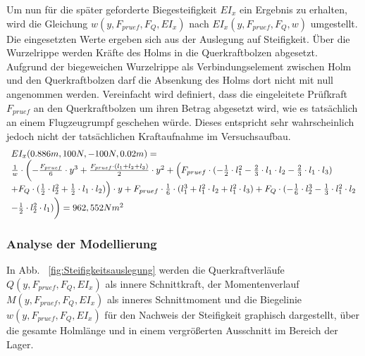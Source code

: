 \noindent Um nun für die später geforderte Biegesteifigkeit $EI_{x}$ ein Ergebnis zu erhalten, wird die Gleichung $w(y,F_{pruef},F_{Q}, EI_{x})$ nach $EI_{x}(y,F_{pruef},F_{Q},w)$ umgestellt. Die eingesetzten Werte ergeben sich aus der Auslegung auf Steifigkeit. Über die Wurzelrippe werden Kräfte des Holms in die Querkraftbolzen abgesetzt. Aufgrund der biegeweichen Wurzelrippe als Verbindungselement zwischen Holm und den Querkraftbolzen darf die Absenkung des Holms dort nicht mit null angenommen werden. Vereinfacht wird definiert, dass die eingeleitete Prüfkraft $F_{pruef}$ an den Querkraftbolzen um ihren Betrag abgesetzt wird, wie es tatsächlich an einem Flugzeugrumpf geschehen würde. Dieses entspricht sehr wahrscheinlich jedoch nicht der tatsächlichen Kraftaufnahme im Versuchsaufbau.
\begin{equation}\label{EIx}
	\begin{array}{l}
		EI_{x}(0.886m, 100N, -100N, 0.02m)= \\
		\frac{1}{w}\cdot\biggl(-\frac{F_{pruef}}{6}\cdot y^{3} + \frac{ F_{pruef}\cdot (l_{1}+l_{2}+l_{3})}{2}\cdot y^{2} + \Bigl(F_{pruef}\cdot(-\frac{1}{2}\cdot l_{1}^{2} -\frac{2}{3}\cdot l_{1}\cdot l_{2}-\frac{2}{3}\cdot l_{1}\cdot l_{3}) \\ +F_{Q}\cdot(\frac{1}{2}\cdot l_{2}^{2}+\frac{1}{2}\cdot l_{1}\cdot l_{2})\Bigr)\cdot y + F_{pruef}\cdot\frac{1}{6}\cdot(l_{1}^{3}+l_{1}^{2}\cdot l_{2}+l_{1}^{2}\cdot l_{3}) + F_{Q}\cdot(-\frac{1}{6}\cdot l_{2}^{3}-\frac{1}{3}\cdot l_{1}^{2}\cdot l_{2}\\-\frac{1}{2}\cdot l_{2}^{2}\cdot l_{1})\biggr)
		=962,552Nm^{2}
	\end{array}
\end{equation}

\subsubsection{Analyse der Modellierung}
In Abb. ~\ref{fig:Steifigkeitsauslegung} werden die Querkraftverläufe $Q(y,F_{pruef},F_{Q},EI_{x})$ als innere Schnittkraft, der Momentenverlauf $M(y,F_{pruef},F_{Q},EI_{x})$ als inneres Schnittmoment und die Biegelinie $w(y,F_{pruef},F_{Q},EI_{x})$ für den Nachweis der Steifigkeit graphisch dargestellt, über die gesamte Holmlänge und in einem vergrößerten Ausschnitt im Bereich der Lager. \\

